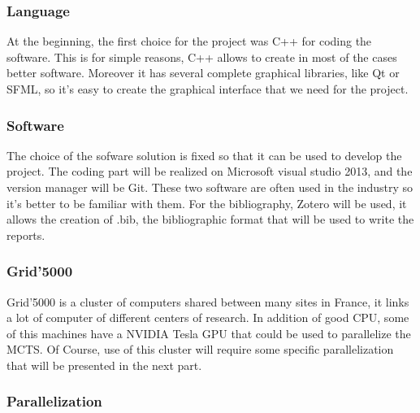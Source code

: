 \subsubsection{Language}

	At the beginning, the first choice for the project was C++ for coding the software. This is for simple reasons, C++ allows to create in most of the cases better software.  Moreover it has several complete graphical libraries, like Qt or SFML, so it's easy to create the graphical interface that we need for the project.

\subsubsection{Software}

	The choice of the sofware solution is fixed so that it can be used to develop the project. The coding part will be realized on Microsoft visual studio 2013, and the version manager will be Git. These two software are often used in the industry so it's better to be familiar with them.
For the bibliography, Zotero will be used, it allows the creation of .bib, the bibliographic format that will be used to write the reports.

\subsubsection{Grid'5000}

	Grid'5000 is a cluster of computers shared between many sites in France, it links a lot of computer of different centers of research. In addition of good CPU, some of this machines have a NVIDIA Tesla GPU that could be used to parallelize the MCTS. Of Course, use of this cluster will require some specific parallelization that will be presented in the next part.

\subsubsection{Parallelization}

